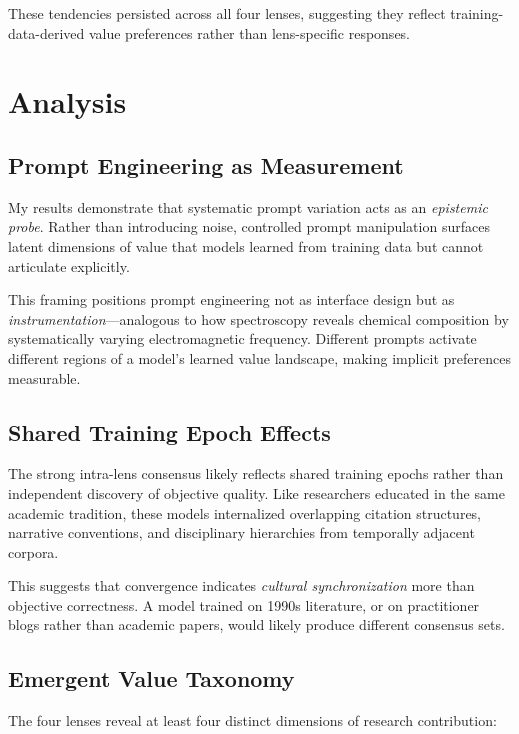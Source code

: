 \documentclass{article}
\begin{document}
These tendencies persisted across all four lenses, suggesting they reflect training-data-derived value preferences rather than lens-specific responses.

\section{Analysis}

\subsection{Prompt Engineering as Measurement}

My results demonstrate that systematic prompt variation acts as an \textit{epistemic probe}. Rather than introducing noise, controlled prompt manipulation surfaces latent dimensions of value that models learned from training data but cannot articulate explicitly.

This framing positions prompt engineering not as interface design but as \textit{instrumentation}—analogous to how spectroscopy reveals chemical composition by systematically varying electromagnetic frequency. Different prompts activate different regions of a model's learned value landscape, making implicit preferences measurable.

\subsection{Shared Training Epoch Effects}

The strong intra-lens consensus likely reflects shared training epochs rather than independent discovery of objective quality. Like researchers educated in the same academic tradition, these models internalized overlapping citation structures, narrative conventions, and disciplinary hierarchies from temporally adjacent corpora.

This suggests that convergence indicates \textit{cultural synchronization} more than objective correctness. A model trained on 1990s literature, or on practitioner blogs rather than academic papers, would likely produce different consensus sets.

\subsection{Emergent Value Taxonomy}

The four lenses reveal at least four distinct dimensions of research contribution:
\end{document}
